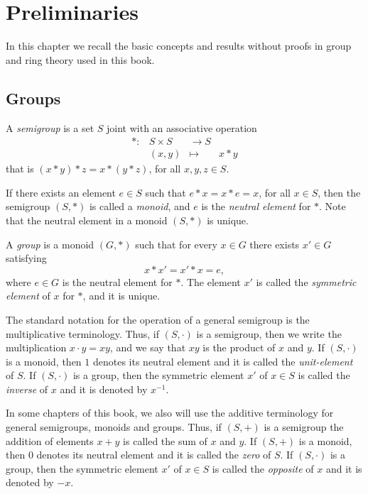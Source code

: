 \chapter{Preliminaries}
\label{preliminaries}


In this chapter we recall the basic concepts and results without proofs in group and ring theory used in this book.

\section*{Groups}

A {\em semigroup} is a set $S$ joint with an associative operation
\[ 
\begin{array}{cccc} *\colon &S\times S&\longrightarrow S\\
&(x,y)&\mapsto&x*y \end{array}
\]
that is $(x*y)*z=x*(y*z)$, for all $x,y,z\in S$.

If there exists an element $e\in S$ such that $e*x=x*e=x$, for all $x\in S$, then the semigroup $(S,*)$ is called a {\em monoid}, and $e$ is the {\em neutral element} for $*$. Note that the neutral element in a monoid $(S,*)$ is unique.

A {\em group} is a monoid $(G,*)$ such that for every $x\in G$ there exists $x'\in G$ satisfying
\[ 
x*x'=x'*x=e,\]
where $e\in G$ is the neutral element for $*$. The element $x'$ is called the {\em symmetric element} of $x$ for $*$, and it is unique.

The standard notation for the operation of a general semigroup is the multiplicative terminology. Thus, if $(S,\cdot)$ is a semigroup, then we write the multiplication  $x\cdot y=xy$, and we say that $xy$ is the product of $x$ and $y$. If $(S,\cdot)$  is a monoid, then $1$ denotes its neutral element and it is called the {\em unit-element} of $S$. If $(S,\cdot)$ is a group, then the symmetric element $x'$ of $x\in S$ is called the {\em inverse} of $x$ and it is denoted by $x^{-1}$.

In some chapters of this book, we also will use the additive terminology for general semigroups, monoids and groups. Thus, if $(S,+)$ is a semigroup the addition of elements $x+y$ is called the sum of $x$ and $y$. If $(S,+)$  is a monoid, then $0$ denotes its neutral element and it is called the {\em zero} of $S$. If $(S,\cdot)$ is a group, then the symmetric element $x'$ of $x\in S$ is called the {\em opposite} of $x$ and it is denoted by $-x$.

